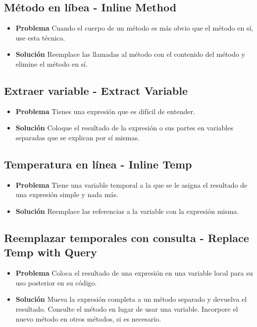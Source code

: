 \documentclass[11pt,a4paper,oneside]{book}
\begin{document}
\subsection{Método en líbea - Inline Method}
\label{inlinemethod}
\begin{itemize}
    \item \textbf{Problema} Cuando el cuerpo de un método es más obvio que el método en sí, use esta técnica.
    \item \textbf{Solución} Reemplace las llamadas al método con el contenido del método y elimine el método en sí.
\end{itemize}

\subsection{Extraer variable - Extract Variable}
\label{extracvariable}
\begin{itemize}
    \item \textbf{Problema} Tienes una expresión que es difícil de entender.
    \item \textbf{Solución} Coloque el resultado de la expresión o sus partes en variables separadas que se explican por sí mismas.
\end{itemize}
    
\subsection{Temperatura en línea - Inline Temp}
\label{inlinetemp}
\begin{itemize}
    \item \textbf{Problema} Tiene una variable temporal a la que se le asigna el resultado de una expresión simple y nada más.
    \item \textbf{Solución} Reemplace las referencias a la variable con la expresión misma.
\end{itemize}
    
\subsection{Reemplazar temporales con consulta - Replace Temp with Query}
\label{replacetempwithquery}
\begin{itemize}
    \item \textbf{Problema} Coloca el resultado de una expresión en una variable local para su uso posterior en su código.
    \item \textbf{Solución} Mueva la expresión completa a un método separado y devuelva el resultado. Consulte el método en lugar de usar una variable. Incorpore el nuevo método en otros métodos, si es necesario.
\end{itemize}
    
\end{document}

